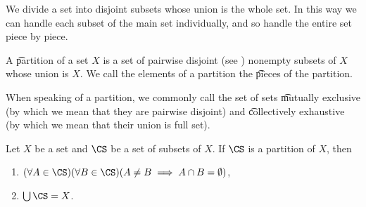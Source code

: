 
We divide a set into disjoint subsets whose union is the whole set.
In this way we can handle each subset of the main set individually, and so handle the entire set piece by piece.

A \t{partition} of a set $X$ is a set of pairwise disjoint (see ) nonempty subsets of $X$ whose union is $X$.
We call the elements of a partition the \t{pieces} of the partition.

When speaking of a partition, we commonly call the set of sets \t{mutually exclusive} (by which we mean that they are pairwise disjoint) and \t{collectively exhaustive} (by which we mean that their union is full set).

Let $X$ be a set and $\CS$ be a set of subsets of $X$.
If $\CS$ is a partition of $X$, then
\begin{enumerate}
  \item $(\forall A \in \CS)(\forall B \in \CS)(A \neq B \implies A \cap B = \emptyset)$,
  \item $\bigcup \CS = X$.
\end{enumerate}

\blankpage

